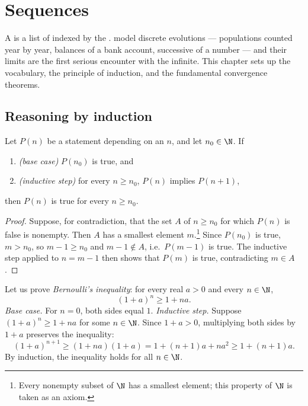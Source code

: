 \chapter{Sequences}\label{ch:g12:seq}

A  is a list of  indexed by the . 
model discrete evolutions --- populations counted year by year, balances of a
bank account, successive  of a number --- and their limits are
the first serious encounter with the infinite. This chapter sets up the
vocabulary, the principle of induction, and the fundamental convergence
theorems.

\section{Reasoning by induction}

\begin{theorem}\label{thm:g12:seq:induction}
Let $P(n)$ be a statement depending on an  $n$, and let $n_0 \in \N$.
If
\begin{enumerate}
  \item \emph{(base case)} $P(n_0)$ is true, and
  \item \emph{(inductive step)} for every $n \geq n_0$, $P(n)$ implies $P(n+1)$,
\end{enumerate}
then $P(n)$ is true for every $n \geq n_0$.
\end{theorem}

\begin{proof}
Suppose, for contradiction, that the set $A$ of  $n \geq n_0$ for
which $P(n)$ is false is nonempty. Then $A$ has a smallest element
$m$.\footnote{Every nonempty subset of $\N$ has a smallest element; this
property of $\N$ is taken as an axiom.} Since $P(n_0)$ is true, $m > n_0$, so
$m - 1 \geq n_0$ and $m-1 \notin A$, i.e.\ $P(m-1)$ is true. The inductive
step applied to $n = m-1$ then shows that $P(m)$ is true, contradicting
$m \in A$.
\end{proof}

\begin{example}\label{ex:g12:seq:bernoulli}
Let us prove \emph{Bernoulli's inequality}: for every real $a > 0$ and every
$n \in \N$,
\[
(1+a)^n \geq 1 + na.
\]
\emph{Base case.} For $n = 0$, both sides equal $1$.
\emph{Inductive step.} Suppose $(1+a)^n \geq 1+na$ for some $n \in \N$. Since
$1 + a > 0$, multiplying both sides by $1+a$ preserves the inequality:
\[
(1+a)^{n+1} \geq (1+na)(1+a) = 1 + (n+1)a + na^2 \geq 1 + (n+1)a .
\]
By induction, the inequality holds for all $n \in \N$.
\end{example}

